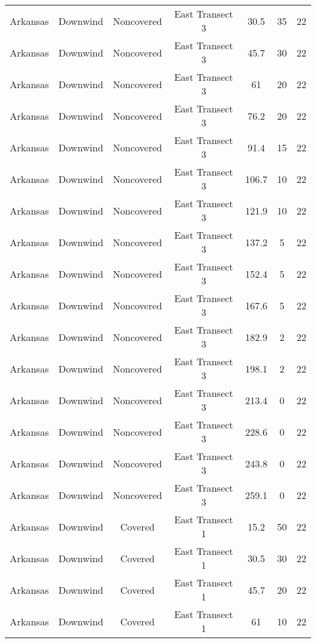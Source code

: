 \documentclass{article}
\begin{document}
\begin{longtable}[c]{ccccccc}
Arkansas  & Downwind  & Noncovered & East Transect 3 & 30.5         & 35          & 22  \\
Arkansas  & Downwind  & Noncovered & East Transect 3 & 45.7         & 30          & 22  \\
Arkansas  & Downwind  & Noncovered & East Transect 3 & 61           & 20          & 22  \\
Arkansas  & Downwind  & Noncovered & East Transect 3 & 76.2         & 20          & 22  \\
Arkansas  & Downwind  & Noncovered & East Transect 3 & 91.4         & 15          & 22  \\
Arkansas  & Downwind  & Noncovered & East Transect 3 & 106.7        & 10          & 22  \\
Arkansas  & Downwind  & Noncovered & East Transect 3 & 121.9        & 10          & 22  \\
Arkansas  & Downwind  & Noncovered & East Transect 3 & 137.2        & 5           & 22  \\
Arkansas  & Downwind  & Noncovered & East Transect 3 & 152.4        & 5           & 22  \\
Arkansas  & Downwind  & Noncovered & East Transect 3 & 167.6        & 5           & 22  \\
Arkansas  & Downwind  & Noncovered & East Transect 3 & 182.9        & 2           & 22  \\
Arkansas  & Downwind  & Noncovered & East Transect 3 & 198.1        & 2           & 22  \\
Arkansas  & Downwind  & Noncovered & East Transect 3 & 213.4        & 0           & 22  \\
Arkansas  & Downwind  & Noncovered & East Transect 3 & 228.6        & 0           & 22  \\
Arkansas  & Downwind  & Noncovered & East Transect 3 & 243.8        & 0           & 22  \\
Arkansas  & Downwind  & Noncovered & East Transect 3 & 259.1        & 0           & 22  \\
Arkansas  & Downwind  & Covered     & East Transect 1 & 15.2         & 50          & 22  \\
Arkansas  & Downwind  & Covered     & East Transect 1 & 30.5         & 30          & 22  \\
Arkansas  & Downwind  & Covered     & East Transect 1 & 45.7         & 20          & 22  \\
Arkansas  & Downwind  & Covered     & East Transect 1 & 61           & 10          & 22  \\

\end{longtable}
\end{document}
